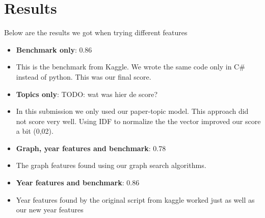 \section{Results \label{sec:results}}

Below are the results we got when trying different features

\begin{itemize}
	\item[] \textbf{Benchmark only}: 0.86
	\item[] This is the benchmark from Kaggle. We wrote the same code only in C\# instead of python. This was our final score.
	\item[] \textbf{Topics only}: TODO: wat was hier de score?
	\item[] In this submission we only used our paper-topic model. This approach did not score very well. Using IDF to normalize the the vector improved our score a bit (0,02). 
	\item[] \textbf{Graph, year features and benchmark}: 0.78
	\item[] The graph features found using our graph search algorithms.
	\item[] \textbf{Year features and  benchmark}: 0.86
	\item[] Year features found by the original script from kaggle worked just as well as our new year features
\end{itemize}



